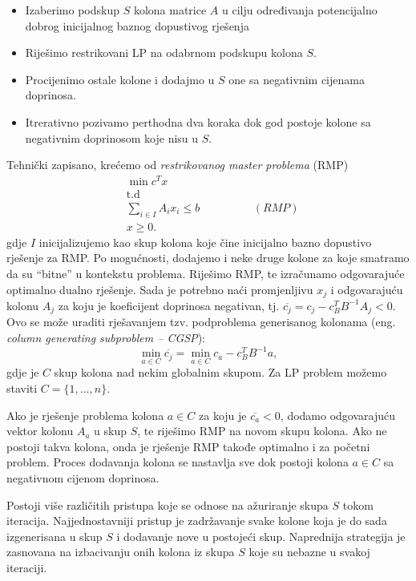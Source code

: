 \documentclass[a4paper, utf8, 11pt, colorlinks]{book}
\theoremstyle{definition}
\begin{document}
\begin{itemize}
   \item Izaberimo podskup $S$ kolona matrice $A$ u cilju određivanja potencijalno dobrog inicijalnog baznog dopustivog rješenja
    \item Riješimo restrikovani LP na odabrnom podskupu kolona $S$.
    \item Procijenimo ostale kolone i dodajmo u $S$ one sa negativnim 
          cijenama doprinosa.
    \item Itrerativno pozivamo perthodna dva koraka dok god postoje kolone   sa negativnim doprinosom koje nisu u $S$.
\end{itemize}
Tehnički zapisano, krećemo od \emph{restrikovanog master problema} (RMP)
\begin{align*}
    &\min c^T x \\
    &\mbox{t.d} \\
    & \sum_{i \in I} A_i x_i  \leq b \hspace{2cm} (RMP)\\
    & x \geq 0. 
\end{align*}
gdje $I$ inicijalizujemo kao skup kolona koje čine inicijalno bazno dopustivo rješenje  za RMP. Po mogućnosti, dodajemo i neke druge kolone za koje smatramo da su ``bitne'' u kontekstu problema.  Riješimo RMP,  te izračunamo odgovarajuće optimalno dualno rješenje. Sada je potrebno naći promjenljivu $x_j$ i odgovarajuću kolonu $A_j$ za koju je koeficijent doprinosa negativan, tj. $\overline{c_j} = c_j - c_B^T B^{-1}A_j < 0$.
Ovo se može uraditi rješavanjem tzv. podproblema generisanog kolonama (eng. \emph{column generating subproblem -- CGSP}):
$$\min_{a \in C} \overline{c_j} = \min_{a \in C} c_a - c_B^T B^{-1} a,$$
gdje je $C$ skup kolona nad nekim globalnim skupom. Za LP problem možemo staviti $C = \{1,\ldots,n\}$. 

Ako je rješenje problema kolona $a \in C$ za koju je $\overline{c_a}<0$, dodamo odgovarajuću vektor kolonu $A_a$ u skup $S$, te riješimo  RMP na novom skupu kolona. Ako ne postoji takva kolona, onda je rješenje RMP takođe optimalno i za početni problem. %
 Proces dodavanja kolona se nastavlja sve dok postoji kolona $a\in C$ sa negativnom cijenom doprinosa. 

Postoji više različitih pristupa koje se odnose na ažuriranje skupa $S$ tokom iteracija. 
Najjednostavniji pristup je zadržavanje svake kolone koja je do sada izgenerisana  u skup $S$ i dodavanje  nove u postojeći skup. Naprednija strategija je zasnovana na izbacivanju onih kolona iz skupa $S$ koje su nebazne u svakoj iteraciji. 
\end{document}
